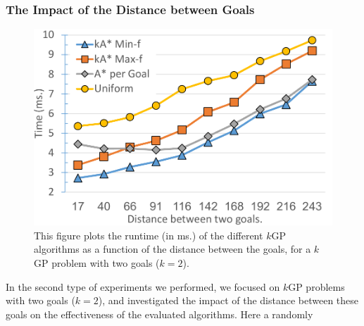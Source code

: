 \documentclass{aicom2e}
\newcommand{\kgs}{$k$GP}
\newcommand{\roni}[1]{\textbf{[RS:#1]}}
\begin{document}
\subsubsection{The Impact of the Distance between Goals}

\begin{figure}
    \includegraphics[width=\columnwidth]{G0-G1_cropped.pdf}
    \caption{This figure plots the runtime (in ms.) of the different \kgs{} algorithms as a function of the distance between the goals, for a \kgs{} problem with two goals ($k=2$).}
    \label{fig:2-goal}
\end{figure}
In the second type of experiments we performed, we focused on \kgs{} problems with two goals ($k=2$), and investigated the impact of the distance between these goals on the effectiveness of the evaluated algorithms. Here a randomly %
\end{document}
